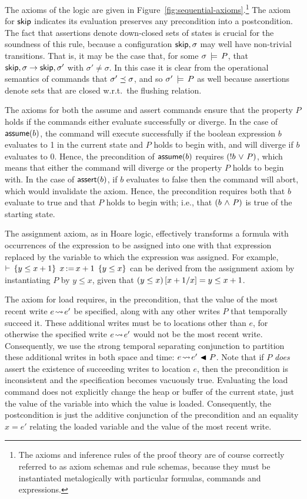 \documentclass[11pt]{report}
\begin{document}
The axioms of the logic are given in Figure~\ref{fig:sequential-axioms}.\footnote{The axioms and inference rules of the proof theory are of course correctly referred to as axiom schemas and rule schemas, because they must be instantiated metalogically with particular formulas, commands and expressions.} The axiom for $\operatorname{\mathsf{skip}}$ indicates its evaluation preserves any precondition into a postcondition. The fact that assertions denote down-closed sets of states is crucial for the soundness of this rule, because a configuration $\operatorname{\mathsf{skip}},\sigma$ may well have non-trivial transitions. That is, it may be the case that, for some $\sigma \,\models\, P$, that $\operatorname{\mathsf{skip}},\sigma \rightarrow \operatorname{\mathsf{skip}},\sigma'$ with $\sigma' \neq \sigma$. In this case it is clear from the operational semantics of commands that $\sigma' \preceq \sigma$, and so $\sigma' \,\models\, P$ as well because assertions denote sets that are closed w.r.t.\ the flushing relation. 

The axioms for both the assume and assert commands ensure that the property $P$ holds if the commands either evaluate successfully or diverge. In the case of $\operatorname{\mathsf{assume}}(b)$, the command will execute successfully if the boolean expression $b$ evaluates to 1 in the current state and $P$ holds to begin with, and will diverge if $b$ evaluates to 0. Hence, the precondition of $\operatorname{\mathsf{assume}}(b)$ requires $(!b \operatorname{\,\vee\,} P)$, which means that either the command will diverge or the property $P$ holds to begin with. In the case of $\operatorname{\mathsf{assert}}(b)$, if $b$ evaluates to false then the command will abort, which would invalidate the axiom. Hence, the precondition requires both that $b$ evaluate to true and that $P$ holds to begin with; i.e., that $(b \operatorname{\,\wedge\,} P)$ is true of the starting state. 

The assignment axiom, as in Hoare logic, effectively transforms a formula with occurrences of the expression to be assigned into one with that expression replaced by the variable to which the expression was assigned. For example, $\vdash\,\left\lbrace y \leq x+1 \right\rbrace\;x \operatorname{:\!=} x+1\;\left\lbrace y \leq x \right\rbrace$ can be derived from the assignment axiom by instantiating $P$ by $y \leq x$, given that $(y \leq x)\left[x+1 / x\right] = y \leq x+1$. 

The axiom for load requires, in the precondition, that the value of the most recent write $e \!\leadsto\! e'$ be specified, along with any other writes $P$ that temporally succeed it. These additional writes must be to locations other than $e$, for otherwise the specified write $e \!\leadsto\! e'$ would not be the most recent write. Consequently, we use the strong temporal separating conjunction to partition these additional writes in both space and time: $e \!\leadsto\! e' \operatorname{\,\blacktriangleleft\,} P$. Note that if $P$ \emph{does} assert the existence of succeeding writes to location $e$, then the precondition is inconsistent and the specification becomes vacuously true. Evaluating the load command does not explicitly change the heap or buffer of the current state, just the value of the variable into which the value is loaded. Consequently, the postcondition is just the additive conjunction of the precondition and an equality $x = e'$ relating the loaded variable and the value of the most recent write. 
\end{document}
